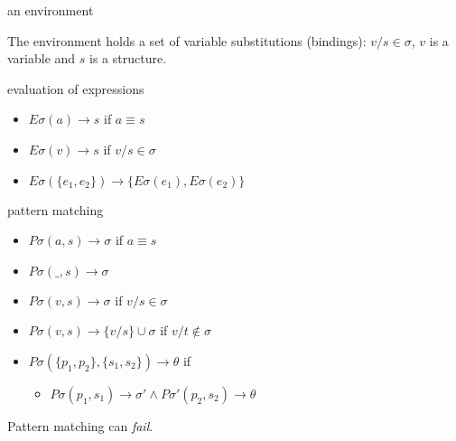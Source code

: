 \begin{frame}{an environment}

\pause\vspace{20pt}
The environment holds a set of variable substitutions (bindings):
$v/s \in \sigma$, $v$ is a variable and $s$ is a structure.


\end{frame}


\begin{frame}{evaluation of expressions}

 \begin{itemize}
   \pause \item $E\sigma(a) \rightarrow s$ if $a \equiv s$

   \pause \item $E\sigma(v) \rightarrow s$ if $v/s \in \sigma$

   \pause \item $E\sigma(\lbrace e_1 , e_2\rbrace) \rightarrow \lbrace E\sigma(e_1), E\sigma(e_2) \rbrace$

 \end{itemize}

\pause\vspace{20pt}{\em Evaluation can result in $\perp$, if a variable is unbound.}

\end{frame}


\begin{frame}{pattern matching}

\begin{itemize}
  \pause \item $P\sigma(a, s) \rightarrow \sigma$  if  $a \equiv s$
  \pause \item $P\sigma(\_,s) \rightarrow \sigma$  
  \pause \item $P\sigma(v, s) \rightarrow \sigma$  if \pause $ v/s \in \sigma $
  \pause \item $P\sigma(v, s) \rightarrow \lbrace v/s \rbrace \cup \sigma$ if \pause $ v/t \not\in \sigma$
  \pause \item $P\sigma(\lbrace p_1, p_2 \rbrace, \lbrace s_1, s_2 \rbrace) \rightarrow \theta$ if
   \begin{itemize}
     \pause \item  $P\sigma(p_1, s_1) \rightarrow \sigma' \wedge P\sigma'(p_2, s_2) \rightarrow \theta$
   \end{itemize}

\end{itemize}

\pause\vspace{20pt}
Pattern matching can {\em fail}. 

\end{frame}

